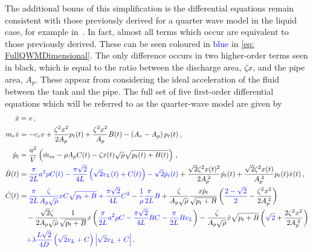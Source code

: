 The additional bonus of this simplification is the differential equations remain consistent with those previously derived for a quarter wave model in the liquid case, for example in~\cite{Hos2015ModelPipe}. In fact, almost all terms which occur are equivalent to those previously derived. These can be seen coloured in \textcolor{Blue}{blue} in \cref{eq: FullQWMDimensional}. The only difference occurs in two higher-order terms seen in black, which is equal to the ratio between the discharge area, $\zeta x$, and the pipe area, $A_p$. These appear from considering the ideal acceleration of the fluid between the tank and the pipe. The full set of five first-order differential equations which will be referred to as the quarter-wave model are given by
~
\begin{equation} \label{eq: FullQWMDimensional}
\begin{split}
    \dot{x} &= v \, , \\
    m_v \dot{v} &= - c_v v + \frac{\zeta^2 x^2}{2 A_p} p_t(t) + \frac{\zeta^2 x^2}{A_p} B(t) - \left( A_v - A_p \right) p_t(t)
    \, , \\
    \dot{p}_t &= \frac{a^2}{V} \left( \dot{m}_{in} - \rho A_p C(t) - \zeta x(t) \sqrt{\rho} \sqrt{p_t(t) + B(t)} \right)
    \, , \\
    \dot{B}(t) &= \textcolor{Blue}{
    \frac{\pi}{2L} a^2 \rho C(t) - \frac{\pi \sqrt{2}}{4L} \left( \sqrt{2} v_L(t) + C(t) \right) - \sqrt{2} \dot{p}_t(t)} + \frac{\sqrt{2} \zeta^2 x(t)^2}{2 A_p\power{2}} \dot{p}_t(t) + \frac{\sqrt{2} \zeta^2 x(t)}{A_p\power{2}} p_t(t) \dot{x}(t)
    \, , \\
    \dot{C}(t) &=
    \textcolor{Blue}{
    \frac{\pi}{2L} \frac{\zeta}{A_p \sqrt{\rho}} x C \sqrt{p_t + B}
    + \frac{\pi \sqrt{2}}{4 L} C^2
    - \frac{1}{\rho} \frac{\pi}{2L} B
    }
    + \frac{\zeta}{A_p \sqrt{\rho}} \frac{x \dot{p}_t}{\sqrt{p_t+B}} \left( 
    \textcolor{Blue}{\frac{2 - \sqrt{2}}{2}} -
    \frac{\zeta^2 x^2}{2 A_p\power{2}} \right)
    \\ & \quad %
    - \frac{\sqrt{2} \zeta}{2 A_p \sqrt{\rho}} \frac{1}{\sqrt{p_t+B}} x \left(
    \textcolor{Blue}{
    \frac{\pi}{2L} a^2 \rho C
    - \frac{\pi \sqrt{2}}{4 L} B C
    - \frac{\pi}{2L} B v_L }
    \right)
    - \frac{\zeta}{A_p \sqrt{\rho}} \dot{x} \sqrt{p_t + B} \left( 
    \textcolor{Blue}{\sqrt{2}} +
    \frac{2 \zeta^2 x^2}{2 A_p\power{2}}
    \right)
    \\ & \quad %
    \textcolor{Blue}{
    + \lambda \frac{L \sqrt{2}}{4 D} \left( \sqrt{2} v_L + C \right) \left| \sqrt{2} v_L + C \right| }
    \, .
\end{split}
\end{equation}

